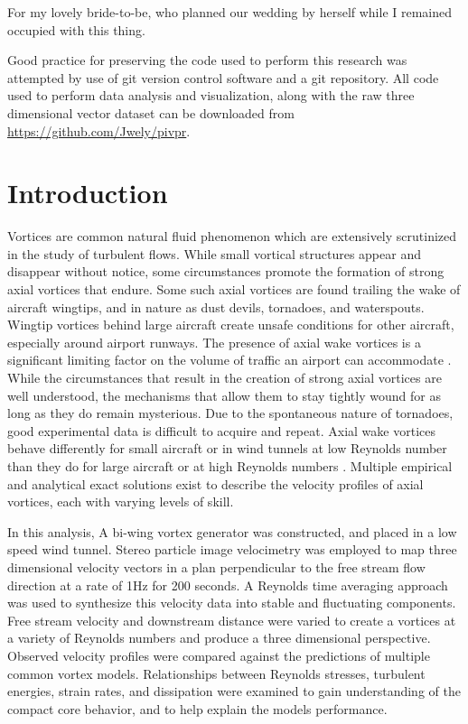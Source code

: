 \documentclass[12pt]{report}
\begin{document}
\beforepreface

For my lovely bride-to-be, who planned our wedding by herself while I remained 
occupied with this thing.

Good practice for preserving the code used to perform this research was 
attempted by use of git version control software and a git repository. All code 
used to perform data analysis and visualization, along with the raw three 
dimensional vector dataset can be downloaded from 
\url{https://github.com/Jwely/pivpr}.
	
%

\afterpreface

\chapter{Introduction}
Vortices are common natural fluid phenomenon which are extensively scrutinized 
in the study of turbulent flows. While small vortical structures appear and 
disappear without notice, some circumstances promote the formation of strong 
axial vortices that endure. Some such axial vortices are found trailing the 
wake of aircraft wingtips, and in nature as dust devils, tornadoes, and 
waterspouts. Wingtip vortices behind large aircraft create unsafe conditions 
for other aircraft, especially around airport runways. The presence of axial 
wake vortices is a significant limiting factor on the volume of traffic an 
airport can accommodate \cite{hallock1991}. While the circumstances that result 
in the creation of strong axial vortices are well understood, the mechanisms 
that allow them to stay tightly wound for as long as they do remain mysterious. 
Due to the spontaneous nature of tornadoes, good experimental data is difficult 
to acquire and repeat. Axial wake vortices behave differently for 
small aircraft or in wind tunnels at low Reynolds number than they do for large 
aircraft or at high Reynolds numbers \cite{burnam2013}. Multiple empirical and 
analytical exact solutions exist to describe the velocity profiles of axial 
vortices, each with varying levels of skill.

In this analysis, A bi-wing vortex generator was constructed, and placed in 
a low speed wind tunnel. Stereo particle image velocimetry was employed to 
map three dimensional velocity vectors in a plan perpendicular to the free 
stream flow direction at a rate of 1Hz for 200 seconds. A Reynolds time 
averaging approach was used to synthesize this velocity data into stable 
and fluctuating components. Free stream velocity and downstream distance 
were varied to create a vortices at a variety of Reynolds numbers and produce a 
three dimensional perspective. Observed velocity profiles were compared against 
the predictions of multiple common vortex models. Relationships between 
Reynolds stresses, turbulent energies, strain rates, and dissipation were
examined to gain understanding of the compact core behavior, and to help 
explain the models performance.
\end{document}
